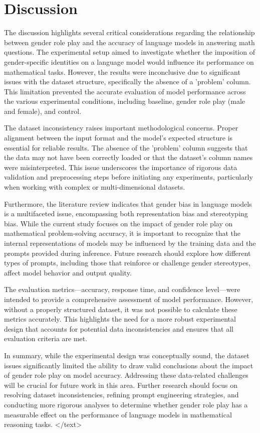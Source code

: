 \documentclass{article}
\begin{document}
\section{Discussion}
The discussion highlights several critical considerations regarding the relationship between gender role play and the accuracy of language models in answering math questions. The experimental setup aimed to investigate whether the imposition of gender-specific identities on a language model would influence its performance on mathematical tasks. However, the results were inconclusive due to significant issues with the dataset structure, specifically the absence of a 'problem' column. This limitation prevented the accurate evaluation of model performance across the various experimental conditions, including baseline, gender role play (male and female), and control.

The dataset inconsistency raises important methodological concerns. Proper alignment between the input format and the model's expected structure is essential for reliable results. The absence of the 'problem' column suggests that the data may not have been correctly loaded or that the dataset's column names were misinterpreted. This issue underscores the importance of rigorous data validation and preprocessing steps before initiating any experiments, particularly when working with complex or multi-dimensional datasets.

Furthermore, the literature review indicates that gender bias in language models is a multifaceted issue, encompassing both representation bias and stereotyping bias. While the current study focuses on the impact of gender role play on mathematical problem-solving accuracy, it is important to recognize that the internal representations of models may be influenced by the training data and the prompts provided during inference. Future research should explore how different types of prompts, including those that reinforce or challenge gender stereotypes, affect model behavior and output quality.

The evaluation metrics—accuracy, response time, and confidence level—were intended to provide a comprehensive assessment of model performance. However, without a properly structured dataset, it was not possible to calculate these metrics accurately. This highlights the need for a more robust experimental design that accounts for potential data inconsistencies and ensures that all evaluation criteria are met.

In summary, while the experimental design was conceptually sound, the dataset issues significantly limited the ability to draw valid conclusions about the impact of gender role play on model accuracy. Addressing these data-related challenges will be crucial for future work in this area. Further research should focus on resolving dataset inconsistencies, refining prompt engineering strategies, and conducting more rigorous analyses to determine whether gender role play has a measurable effect on the performance of language models in mathematical reasoning tasks.
</text>
\end{document}
